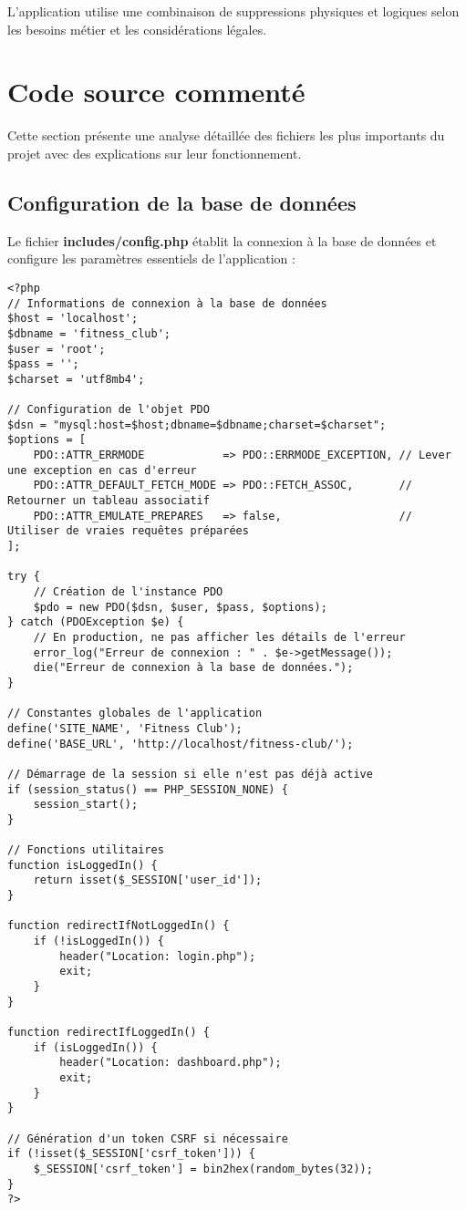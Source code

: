 \documentclass[12pt,a4paper]{report}
\begin{document}
L'application utilise une combinaison de suppressions physiques et logiques selon les besoins métier et les considérations légales. 

\chapter{Code source commenté}

Cette section présente une analyse détaillée des fichiers les plus importants du projet avec des explications sur leur fonctionnement.

\section{Configuration de la base de données}
Le fichier \textbf{includes/config.php} établit la connexion à la base de données et configure les paramètres essentiels de l'application :

\begin{lstlisting}[style=phpStyle, caption=includes/config.php - Configuration de la base de données]
<?php
// Informations de connexion à la base de données
$host = 'localhost';
$dbname = 'fitness_club';
$user = 'root';
$pass = '';
$charset = 'utf8mb4';

// Configuration de l'objet PDO
$dsn = "mysql:host=$host;dbname=$dbname;charset=$charset";
$options = [
    PDO::ATTR_ERRMODE            => PDO::ERRMODE_EXCEPTION, // Lever une exception en cas d'erreur
    PDO::ATTR_DEFAULT_FETCH_MODE => PDO::FETCH_ASSOC,       // Retourner un tableau associatif
    PDO::ATTR_EMULATE_PREPARES   => false,                  // Utiliser de vraies requêtes préparées
];

try {
    // Création de l'instance PDO
    $pdo = new PDO($dsn, $user, $pass, $options);
} catch (PDOException $e) {
    // En production, ne pas afficher les détails de l'erreur
    error_log("Erreur de connexion : " . $e->getMessage());
    die("Erreur de connexion à la base de données.");
}

// Constantes globales de l'application
define('SITE_NAME', 'Fitness Club');
define('BASE_URL', 'http://localhost/fitness-club/');

// Démarrage de la session si elle n'est pas déjà active
if (session_status() == PHP_SESSION_NONE) {
    session_start();
}

// Fonctions utilitaires
function isLoggedIn() {
    return isset($_SESSION['user_id']);
}

function redirectIfNotLoggedIn() {
    if (!isLoggedIn()) {
        header("Location: login.php");
        exit;
    }
}

function redirectIfLoggedIn() {
    if (isLoggedIn()) {
        header("Location: dashboard.php");
        exit;
    }
}

// Génération d'un token CSRF si nécessaire
if (!isset($_SESSION['csrf_token'])) {
    $_SESSION['csrf_token'] = bin2hex(random_bytes(32));
}
?>
\end{lstlisting}
\end{document}
